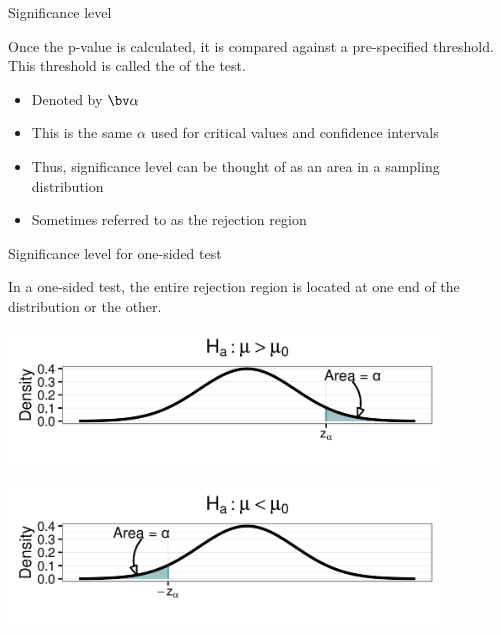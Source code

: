 \documentclass[xcolor=table]{beamer}
\begin{document}
\begin{frame}{Significance level}
\begin{block}{}
\large Once the p-value is calculated, it is compared against a pre-specified threshold. This threshold is called the  of the test.
\begin{itemize}
\pause\item Denoted by $\bv \alpha$
\pause\item This is the same $\alpha$ used for critical values and confidence intervals
\pause\item Thus, significance level can be thought of as an area in a sampling distribution
\pause\item Sometimes referred to as the rejection region
\end{itemize}
\end{block}
\end{frame}

\begin{frame}{Significance level for one-sided test}
\begin{block}{}
\large
In a one-sided test, the entire rejection region is located at one end of the distribution or the other.
\end{block}
{\centering
\includegraphics[width=4.5in]{../images/ch08_sig_up}
\par}
{\centering
\includegraphics[width=4.5in]{../images/ch08_sig_low}
\par}

\end{frame}
\end{document}
